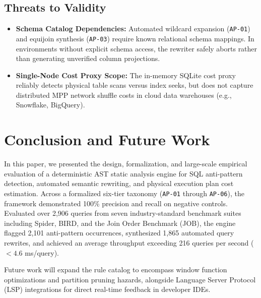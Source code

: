 \documentclass[conference]{IEEEtran}
\begin{document}
\subsection{Threats to Validity}
\begin{itemize}
    \item \textbf{Schema Catalog Dependencies:} Automated wildcard expansion (\texttt{AP-01}) and equijoin synthesis (\texttt{AP-03}) require known relational schema mappings. In environments without explicit schema access, the rewriter safely aborts rather than generating unverified column projections.
    \item \textbf{Single-Node Cost Proxy Scope:} The in-memory SQLite cost proxy reliably detects physical table scans versus index seeks, but does not capture distributed MPP network shuffle costs in cloud data warehouses (e.g., Snowflake, BigQuery).
\end{itemize}

\section{Conclusion and Future Work}

In this paper, we presented the design, formalization, and large-scale empirical evaluation of a deterministic AST static analysis engine for SQL anti-pattern detection, automated semantic rewriting, and physical execution plan cost estimation. Across a formalized six-tier taxonomy (\texttt{AP-01} through \texttt{AP-06}), the framework demonstrated 100\% precision and recall on negative controls. Evaluated over 2,906 queries from seven industry-standard benchmark suites including Spider, BIRD, and the Join Order Benchmark (JOB), the engine flagged 2,101 anti-pattern occurrences, synthesized 1,865 automated query rewrites, and achieved an average throughput exceeding 216 queries per second ($<4.6$ ms/query).

Future work will expand the rule catalog to encompass window function optimizations and partition pruning hazards, alongside Language Server Protocol (LSP) integrations for direct real-time feedback in developer IDEs.
\end{document}

